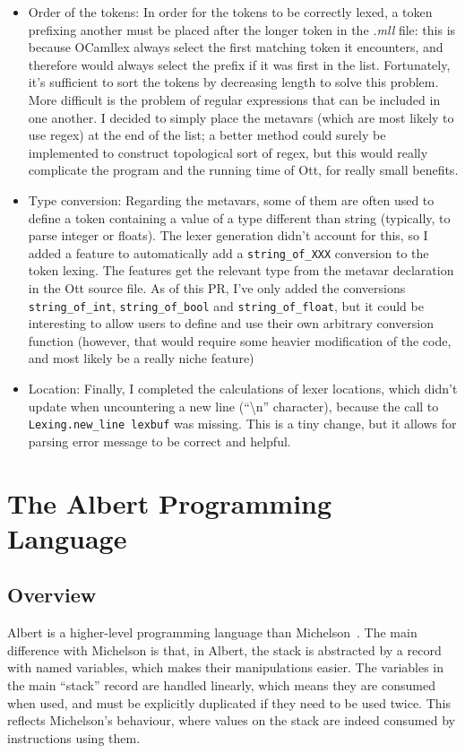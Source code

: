 \documentclass{report}
\begin{document}
\begin{itemize}
\item Order of the tokens: In order for the tokens to be correctly lexed, a token prefixing another must be placed after the longer token in the \textit{.mll} file: this is because OCamllex always select the first matching token it encounters, and therefore would always select the prefix if it was first in the list. Fortunately, it's sufficient to sort the tokens by decreasing length to solve this problem. More difficult is the problem of regular expressions that can be included in one another. I decided to simply place the metavars (which are most likely to use regex) at the end of the list; a better method could surely be implemented to construct topological sort of regex, but this would really complicate the program and the running time of Ott, for really small benefits.
\item Type conversion: Regarding the metavars, some of them are often used to define a token containing a value of a type different than string (typically, to parse integer or floats). The lexer generation didn't account for this, so I added a feature to automatically add a \texttt{string\_of\_XXX} conversion to the token lexing. The features get the relevant type from the metavar declaration in the Ott source file. As of this PR, I've only added the conversions \texttt{string\_of\_int}, \texttt{string\_of\_bool} and \texttt{string\_of\_float}, but it could be interesting to allow users to define and use their own arbitrary conversion function (however, that would require some heavier modification of the code, and most likely be a really niche feature)
\item Location: Finally, I completed the calculations of lexer locations, which didn't update when uncountering a new line (``\textbackslash n'' character), because the call to \texttt{Lexing.new\_line lexbuf} was missing. This is a tiny change, but it allows for parsing error message to be correct and helpful.
\end{itemize}

\chapter{The Albert Programming Language}

\section{Overview}

Albert is a higher-level programming language than Michelson~\cite{albertProposal}. The main difference with Michelson is that, in Albert, the stack is abstracted by a record with named variables, which makes their manipulations easier. The variables in the main ``stack'' record are handled linearly, which means they are consumed when used, and must be explicitly duplicated if they need to be used twice. This reflects Michelson's behaviour, where values on the stack are indeed consumed by instructions using them.\\
\end{document}
